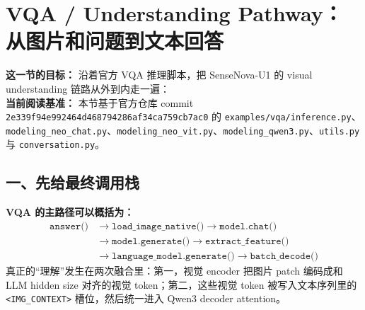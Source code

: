 
\section{VQA / Understanding Pathway：从图片和问题到文本回答}

\begin{conceptbox}
\textbf{这一节的目标：} 沿着官方 VQA 推理脚本，把 SenseNova-U1 的 visual understanding 链路从外到内走一遍：\\
\textbf{当前阅读基准：} 本节基于官方仓库 commit \texttt{2e339f94e992464d468794286af34ca759cb7ac0} 的 \texttt{examples/vqa/inference.py}、\texttt{modeling\_neo\_chat.py}、\texttt{modeling\_neo\_vit.py}、\texttt{modeling\_qwen3.py}、\texttt{utils.py} 与 \texttt{conversation.py}。
\end{conceptbox}

\subsection{一、先给最终调用栈}

\begin{summarybox}
\textbf{VQA 的主路径可以概括为：}
\[
\begin{aligned}
\texttt{answer()} &\rightarrow \texttt{load\_image\_native()} \rightarrow \texttt{model.chat()} \\
&\rightarrow \texttt{model.generate()} \rightarrow \texttt{extract\_feature()} \\
&\rightarrow \texttt{language\_model.generate()} \rightarrow \texttt{batch\_decode()}
\end{aligned}
\]
真正的“理解”发生在两次融合里：第一，视觉 encoder 把图片 patch 编码成和 LLM hidden size 对齐的视觉 token；第二，这些视觉 token 被写入文本序列里的 \texttt{<IMG\_CONTEXT>} 槽位，然后统一进入 Qwen3 decoder attention。
\end{summarybox}

